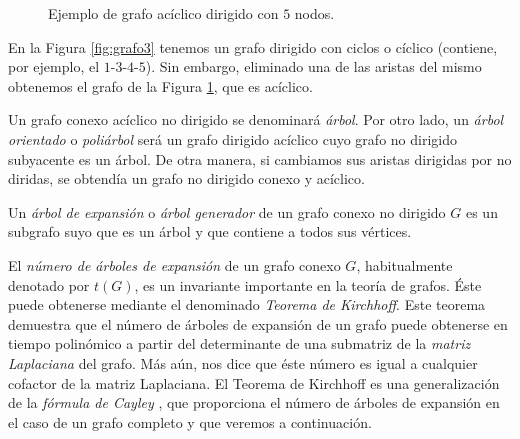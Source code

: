 \begin{figure}[H]
\centering
{}
\caption{Ejemplo de grafo acíclico dirigido con $5$ nodos.}
\label{fig:grafo8}
\end{figure}

\begin{exampleth}
En la Figura \ref{fig:grafo3} tenemos un grafo dirigido con ciclos o cíclico (contiene, por ejemplo, el $1$-$3$-$4$-$5$). Sin embargo, eliminado una de las aristas del mismo obtenemos el grafo de la Figura \ref{fig:grafo8}, que es acíclico. 
\end{exampleth}

\begin{definition}
Un grafo conexo acíclico no dirigido se denominará \emph{árbol}. Por otro lado, un \emph{árbol orientado} o \emph{poliárbol} será un grafo dirigido acíclico cuyo grafo no dirigido subyacente es un árbol. De otra manera, si cambiamos sus aristas dirigidas por no diridas, se obtendía un grafo no dirigido conexo y acíclico.
\end{definition}

\begin{definition}
Un \emph{árbol de expansión} o \emph{árbol generador} de un grafo conexo no dirigido $G$ es un subgrafo suyo que es un árbol y que contiene a todos sus vértices.

El \emph{número de árboles de expansión} de un grafo conexo $G$, habitualmente denotado por $t(G)$, es un invariante importante en la teoría de grafos. Éste puede obtenerse mediante el denominado \emph{Teorema de Kirchhoff}. Este teorema demuestra que el número de árboles de expansión de un grafo puede obtenerse en tiempo polinómico a partir del determinante de una submatriz de la \emph{matriz Laplaciana} del grafo. Más aún, nos dice que éste número es igual a cualquier cofactor de la matriz Laplaciana. El Teorema de Kirchhoff es una generalización de la \emph{fórmula de Cayley} \cite{EspinosaArmenta:LaFormulaDeCayley}, que proporciona el número de árboles de expansión en el caso de un grafo completo y que veremos a continuación.
\end{definition}

